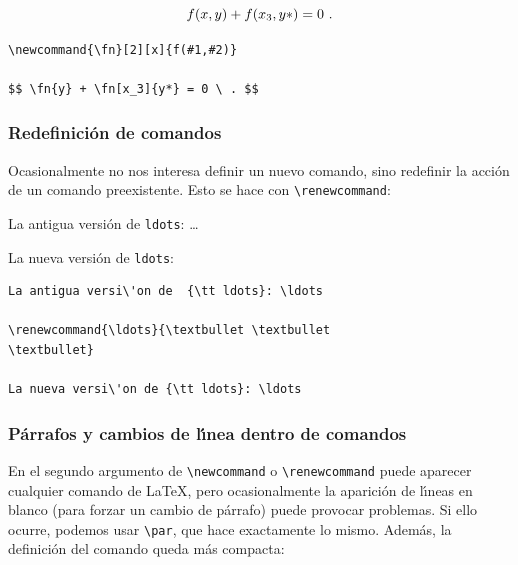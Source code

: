 {{\begin{minipage}[t]{5cm}
$$ \fn{y} + \fn[x_3]{y*} = 0 \ . $$
\end{minipage}
\hspace{1.5cm}
\begin{minipage}[t]{5cm}
\begin{verbatim}
\newcommand{\fn}[2][x]{f(#1,#2)}

$$ \fn{y} + \fn[x_3]{y*} = 0 \ . $$
\end{verbatim}
\end{minipage}
}
\vspace{.3cm}

\subsubsection{Redefinici\'on de comandos}

Ocasionalmente no nos interesa definir un nuevo comando, sino
redefinir la acci\'on de un comando preexistente. Esto se hace con
\verb+\renewcommand+:

\vspace{.3cm}
{\small
\begin{minipage}[t]{5cm}
La antigua versi\'on de {\tt ldots}: \ldots

\renewcommand{\ldots}{\textbullet \textbullet 
\textbullet}

La nueva versi\'on de {\tt ldots}: \ldots
\end{minipage}
\hspace{.5cm}
\begin{minipage}[t]{5cm}
\begin{verbatim}
La antigua versi\'on de  {\tt ldots}: \ldots

\renewcommand{\ldots}{\textbullet \textbullet 
\textbullet}

La nueva versi\'on de {\tt ldots}: \ldots
\end{verbatim}
\end{minipage}
}
\vspace{.3cm}


\subsubsection{P\'arrafos y cambios de l\'{\i}nea dentro de comandos}

En el segundo argumento de \verb+\newcommand+ o \verb+\renewcommand+
puede aparecer cualquier comando de \LaTeX, pero ocasionalmente la
aparici\'on de l\'{\i}neas en blanco (para forzar un cambio de
p\'arrafo) puede provocar problemas. Si ello ocurre, podemos usar
\verb+\par+, que hace exactamente lo mismo. Adem\'as, la definici\'on
del comando queda m\'as compacta:

}
